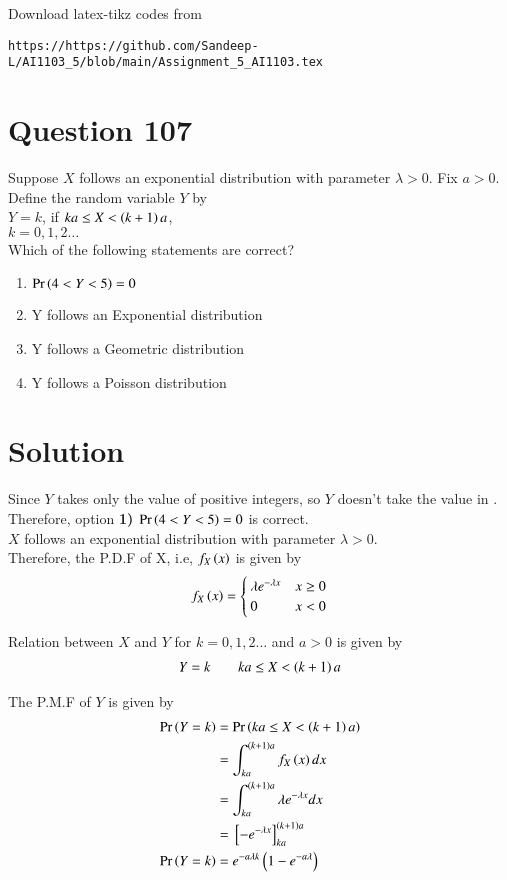 \documentclass[journal,12pt,twocolumn]{IEEEtran}
\begin{document}
Download latex-tikz codes from 
%
\begin{lstlisting}
https://https://github.com/Sandeep-L/AI1103_5/blob/main/Assignment_5_AI1103.tex
\end{lstlisting}

\section*{Question 107}
Suppose $X$ follows an exponential distribution with parameter $\lambda>0$. Fix $a>0$. Define the random variable $Y$ by\\
$Y=k$, \qquad if $ka \leq X < \left(k+1\right)a$,\\
$k=0,1,2\ldots$\\
Which of the following statements are correct?
\begin{enumerate}
\setlength\itemsep{0.5em}
    \item $\Pr\left(4<Y<5\right)=0$
    \item Y follows an Exponential distribution
    \item Y follows a Geometric distribution
    \item Y follows a Poisson distribution
\end{enumerate}

\section*{Solution}
Since $Y$ takes only the value of positive integers, so $Y$ doesn't take the value in .\\
Therefore, option \textbf{1) $\Pr\left(4<Y<5\right)=0$} is correct.\\

$X$ follows an exponential distribution with parameter $\lambda>0$.\\
Therefore, the P.D.F of X, i.e, $f_X\left(x\right)$ is given by
\begin{align}
    f_X\left(x\right) =
\begin{cases}
    \lambda e^{-\lambda x} & x\geq 0 \\
    0 & x<0
\end{cases}
\end{align}

Relation between $X$ and $Y$ for $k=0,1,2\ldots$ and $a>0$ is given by
\begin{align}
    Y=k \qquad ka\leq X < \left(k+1\right)a
\end{align}

The P.M.F of $Y$ is given by
\begin{align}
    \Pr\left(Y=k\right) &= \Pr\left(ka\leq X < \left(k+1\right)a\right)\\
    &= \int_{ka}^{\left(k+1\right)a}f_X\left(x\right)dx\\
    &= \int_{ka}^{\left(k+1\right)a}\lambda e^{-\lambda x}dx\\
    &= {}\left[-e^{-\lambda x}\right]_{ka}^{\left(k+1\right)a}\\
    \Pr\left(Y=k\right) &= e^{-a\lambda k}\left(1 - e^{-a\lambda}\right)
\end{align}
\end{document}
